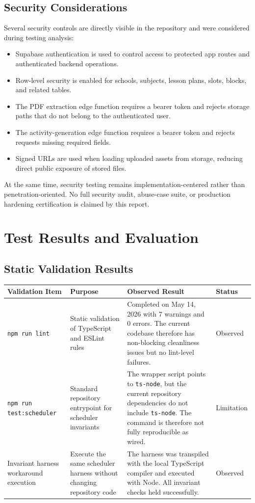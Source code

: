 \documentclass[12pt]{article}
\begin{document}
\subsection{Security Considerations}

Several security controls are directly visible in the repository and were considered during testing analysis:
\begin{itemize}
    \item Supabase authentication is used to control access to protected app routes and authenticated backend operations.
    \item Row-level security is enabled for schools, subjects, lesson plans, slots, blocks, and related tables.
    \item The PDF extraction edge function requires a bearer token and rejects storage paths that do not belong to the authenticated user.
    \item The activity-generation edge function requires a bearer token and rejects requests missing required fields.
    \item Signed URLs are used when loading uploaded assets from storage, reducing direct public exposure of stored files.
\end{itemize}

At the same time, security testing remains implementation-centered rather than penetration-oriented. No full security audit, abuse-case suite, or production hardening certification is claimed by this report.

\newpage

\section{Test Results and Evaluation}

\subsection{Static Validation Results}

\begin{longtable}{|L{3.5cm}|L{4.2cm}|L{5.5cm}|L{2cm}|}
\hline
\textbf{Validation Item} & \textbf{Purpose} & \textbf{Observed Result} & \textbf{Status} \\
\hline
\texttt{npm run lint} & Static validation of TypeScript and ESLint rules & Completed on May 14, 2026 with 7 warnings and 0 errors. The current codebase therefore has non-blocking cleanliness issues but no lint-level failures. & Observed \\
\hline
\texttt{npm run test:scheduler} & Standard repository entrypoint for scheduler invariants & The wrapper script points to \texttt{ts-node}, but the current repository dependencies do not include \texttt{ts-node}. The command is therefore not fully reproducible as wired. & Limitation \\
\hline
Invariant harness workaround execution & Execute the same scheduler harness without changing repository code & The harness was transpiled with the local TypeScript compiler and executed with Node. All invariant checks held successfully. & Observed \\
\hline
\end{longtable}
\end{document}
